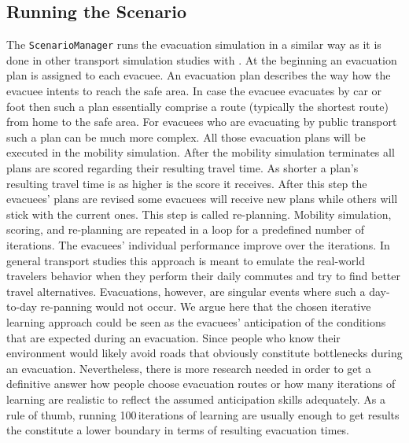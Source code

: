 \subsection{Running the Scenario}
The \lstinline|ScenarioManager| runs the evacuation simulation in a similar way as it is done in other transport simulation studies with . 
At the beginning an evacuation plan is assigned to each evacuee. 
An evacuation plan describes the way how the evacuee intents to reach the safe area.
In case the evacuee evacuates by car or foot then such a plan essentially comprise a route (typically the shortest route) from home to the safe area. For evacuees who are evacuating by public transport such a plan can be much more complex. All those evacuation plans will be executed in the mobility simulation. After the mobility simulation terminates all plans are scored regarding their resulting travel time. 
As shorter a plan's resulting travel time is as higher is the score it receives. After this step the evacuees' plans are revised some evacuees will receive new plans while others will stick with the current ones. This step is called re-planning. Mobility simulation, scoring, and re-planning are repeated in a loop for a predefined number of iterations. The evacuees' individual performance improve over the iterations. 
In general transport studies this approach is meant to emulate the real-world travelers behavior when they perform their daily commutes and try to find better travel alternatives. Evacuations, however, are singular events where such a day-to-day re-panning would not occur. We argue here that the chosen iterative learning approach could be seen as the evacuees' anticipation of the conditions that are expected during an evacuation. 
Since people who know their  environment would likely avoid roads that obviously constitute bottlenecks during an evacuation. Nevertheless, there is more research needed in order to get a definitive answer how people choose evacuation routes or how many iterations of learning are realistic to reflect the assumed anticipation skills adequately. As a rule of thumb, running 100\,iterations of learning are usually enough to get results the constitute a lower boundary in terms of resulting evacuation times.

